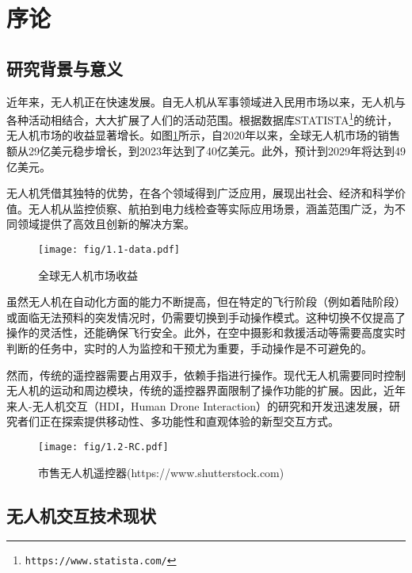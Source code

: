 \ifx\allfiles\undefined


\else
\fi
\section{序论}

\subsection{研究背景与意义}

近年来，无人机正在快速发展。自无人机从军事领域进入民用市场以来，无人机与各种活动相结合，大大扩展了人们的活动范围。根据数据库STATISTA\footnote{\texttt{https://www.statista.com/}}的统计，无人机市场的收益显著增长。如图\ref{fig:Drone revenue}所示，自2020年以来，全球无人机市场的销售额从29亿美元稳步增长，到2023年达到了40亿美元。此外，预计到2029年将达到49亿美元。

无人机凭借其独特的优势，在各个领域得到广泛应用，展现出社会、经济和科学价值。无人机从监控侦察、航拍到电力线检查等实际应用场景，涵盖范围广泛，为不同领域提供了高效且创新的解决方案。
\begin{figure}[htbp]
    \centering
    \texttt{[image: fig/1.1-data.pdf]}
    \caption{全球无人机市场收益}
    \label{fig:Drone revenue}
\end{figure}

虽然无人机在自动化方面的能力不断提高，但在特定的飞行阶段（例如着陆阶段）或面临无法预料的突发情况时，仍需要切换到手动操作模式。这种切换不仅提高了操作的灵活性，还能确保飞行安全。此外，在空中摄影和救援活动等需要高度实时判断的任务中，实时的人为监控和干预尤为重要，手动操作是不可避免的。

然而，传统的遥控器需要占用双手，依赖手指进行操作。现代无人机需要同时控制无人机的运动和周边模块，传统的遥控器界面限制了操作功能的扩展。因此，近年来人-无人机交互（HDI，Human Drone Interaction）的研究和开发迅速发展，研究者们正在探索提供移动性、多功能性和直观体验的新型交互方式。

\begin{figure}[htbp]
    \centering
    \texttt{[image: fig/1.2-RC.pdf]}
    \caption{市售无人机遥控器(https://www.shutterstock.com)}
    \label{fig:2.1-Controller}
\end{figure}

\subsection{无人机交互技术现状}

